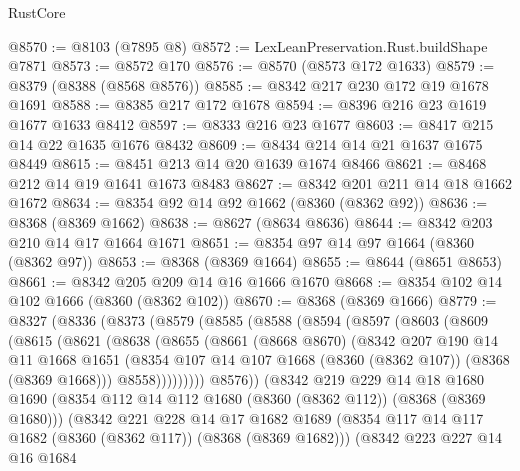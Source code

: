 \begin{lexlean}{RustCore}
\begin{coremodule}
@8570 := @8103 (@7895 @8)
@8572 := LexLeanPreservation.Rust.buildShape @7871
@8573 := @8572 @170
@8576 := @8570 (@8573 @172 @1633)
@8579 := @8379 (@8388 (@8568 @8576))
@8585 := @8342 @217 @230 @172 @19 @1678 @1691
@8588 := @8385 @217 @172 @1678
@8594 := @8396 @216 @23 @1619 @1677 @1633 @8412
@8597 := @8333 @216 @23 @1677
@8603 := @8417 @215 @14 @22 @1635 @1676 @8432
@8609 := @8434 @214 @14 @21 @1637 @1675 @8449
@8615 := @8451 @213 @14 @20 @1639 @1674 @8466
@8621 := @8468 @212 @14 @19 @1641 @1673 @8483
@8627 := @8342 @201 @211 @14 @18 @1662 @1672
@8634 := @8354 @92 @14 @92 @1662 (@8360 (@8362 @92))
@8636 := @8368 (@8369 @1662)
@8638 := @8627 (@8634 @8636)
@8644 := @8342 @203 @210 @14 @17 @1664 @1671
@8651 := @8354 @97 @14 @97 @1664 (@8360 (@8362 @97))
@8653 := @8368 (@8369 @1664)
@8655 := @8644 (@8651 @8653)
@8661 := @8342 @205 @209 @14 @16 @1666 @1670
@8668 := @8354 @102 @14 @102 @1666 (@8360 (@8362 @102))
@8670 := @8368 (@8369 @1666)
@8779 := @8327
    (@8336
      (@8373
        (@8579
          (@8585
            (@8588
              (@8594
                (@8597
                  (@8603
                    (@8609
                      (@8615
                        (@8621
                          (@8638
                            (@8655
                              (@8661
                                (@8668 @8670)
                                (@8342
                                  @207
                                  @190
                                  @14
                                  @11
                                  @1668
                                  @1651
                                  (@8354
                                    @107
                                    @14
                                    @107
                                    @1668
                                    (@8360 (@8362 @107))
                                    (@8368 (@8369 @1668)))
                                  @8558)))))))))
                @8576))
            (@8342
              @219
              @229
              @14
              @18
              @1680
              @1690
              (@8354 @112 @14 @112 @1680 (@8360 (@8362 @112)) (@8368 (@8369 @1680)))
              (@8342
                @221
                @228
                @14
                @17
                @1682
                @1689
                (@8354 @117 @14 @117 @1682 (@8360 (@8362 @117)) (@8368 (@8369 @1682)))
                (@8342
                  @223
                  @227
                  @14
                  @16
                  @1684

\end{coremodule}
\end{lexlean}
